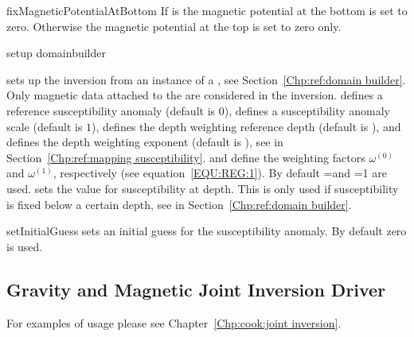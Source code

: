 \begin{methoddesc}[MagneticInversion]{fixMagneticPotentialAtBottom}{}
If  is \True the magnetic potential at the bottom is set to zero. Otherwise  the magnetic
 potential at the top is set to zero only. 
\end{methoddesc}



\begin{methoddesc}[MagneticInversion]{setup}{
domainbuilder
}

sets up the inversion from an instance  of a , see Section~\ref{Chp:ref:domain builder}.
Only magnetic data attached to the  are considered in the inversion.
 defines a reference susceptibility anomaly (default is $0$), 
 defines a susceptibility anomaly scale (default is $1$),
 defines the depth weighting reference depth (default is \None), and
 defines the depth weighting exponent (default is \None),
see  in Section~\ref{Chp:ref:mapping susceptibility}.
 and  define the weighting factors
$\omega^{(0)}$ and
$\omega^{(1)}$, respectively (see equation~\ref{EQU:REG:1}).
By default =\None and =1 are used.
 sets the value for susceptibility at depth. This is only used if susceptibility is fixed below a certain depth,
see  in Section~\ref{Chp:ref:domain builder}.
\end{methoddesc}

\begin{methoddesc}[MagneticInversion]{setInitialGuess}{}
sets an initial guess for the susceptibility anomaly. By default zero is used.
\end{methoddesc}

\subsection{Gravity and Magnetic Joint Inversion Driver}
For examples of usage please see Chapter~\ref{Chp:cook:joint inversion}.

